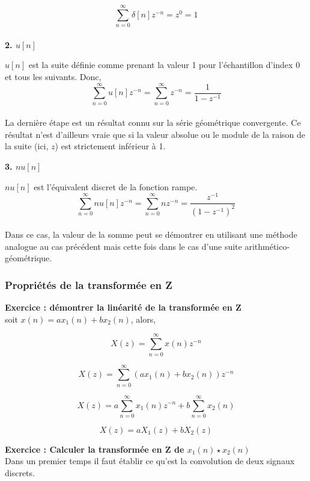 \documentclass[11pt,a4paper]{article}
\begin{document}
\[\sum_{n = 0}^{\infty} \delta[n] z^{-n} = z^0 = 1 \]\\

\textbf{2. $u[n]$}

$u[n]$ est la suite définie comme prenant la valeur 1 pour l'échantillon d'index 0 et tous les suivants. Donc,\\

\[\sum_{n = 0}^{\infty} u[n] z^{-n} = \sum_{n = 0}^{\infty} z^{-n}  = \frac{1}{1-z^{-1}} \]\\

La dernière étape est un résultat connu sur la série géométrique convergente. Ce résultat n'est d'ailleurs vraie que si la valeur absolue ou le module de la raison de la suite (ici, $z$) est strictement inférieur à 1. 

\textbf{3. $nu[n]$}

 $nu[n]$ est l'équivalent discret de la fonction rampe.\\
 

\[\sum_{n = 0}^{\infty} n u[n] z^{-n} = \sum_{n = 0}^{\infty} n z^{-n}  = \frac{z^{-1}}{(1-z^{-1})^2} \]\\ 

Dans ce cas, la valeur de la somme peut se démontrer en utilisant une méthode analogue au cas précédent mais cette fois dans le cas d'une suite arithmético-géométrique.



\subsubsection{Propriétés de la transformée en Z}

\textbf{Exercice : démontrer la linéarité de la transformée en Z}\\

soit $x(n) = a x_1(n) + b x_2(n)$, alors,

\[X(z) = \sum_{n = 0}^{\infty} x(n) z^{-n}\] 

\[X(z) = \sum_{n = 0}^{\infty} (a x_1(n) + b x_2(n)) z^{-n}\] 

\[X(z) = a \sum_{n = 0}^{\infty} x_1(n)  z^{-n} + b \sum_{n = 0}^{\infty} x_2(n) \] 

\[X(z) = a X_1(z)+ b X_2(z) \] 

\textbf{Exercice : Calculer la transformée en Z de $x_1(n) \star x_2(n)$}\\

Dans un premier temps il faut établir ce qu'est la convolution  de deux signaux discrets.
\end{document}
